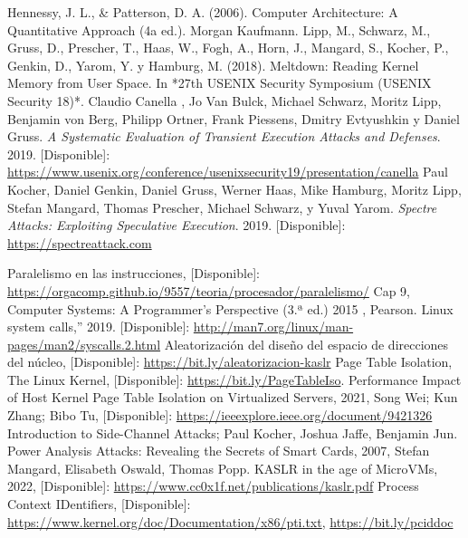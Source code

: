 \documentclass[lettersize,compsoc]{IEEEtran}
\begin{document}
\begin{thebibliography}{9}

 Hennessy, J. L., & Patterson, D. A. (2006). Computer Architecture: A Quantitative Approach (4a ed.). Morgan Kaufmann.
 Lipp, M., Schwarz, M., Gruss, D., Prescher, T., Haas, W., Fogh, A., Horn, J., Mangard, S., Kocher, P., Genkin, D., Yarom, Y. y Hamburg, M. (2018). Meltdown: Reading Kernel Memory from User Space. In *27th USENIX Security Symposium (USENIX Security 18)*.
 Claudio Canella , Jo Van Bulck, Michael Schwarz, Moritz Lipp, Benjamin von Berg, Philipp Ortner, Frank Piessens, Dmitry Evtyushkin y Daniel Gruss. \textit{A Systematic Evaluation of Transient Execution Attacks and Defenses}. 2019. [Disponible]: \url{https://www.usenix.org/conference/usenixsecurity19/presentation/canella}
 Paul Kocher, Daniel Genkin, Daniel Gruss, Werner Haas, Mike Hamburg, Moritz Lipp, Stefan Mangard, Thomas Prescher, Michael Schwarz, y Yuval Yarom. \textit{Spectre Attacks: Exploiting Speculative Execution}. 2019. [Disponible]: \url{https://spectreattack.com}

 Paralelismo en las instrucciones, [Disponible]: \url{https://orgacomp.github.io/9557/teoria/procesador/paralelismo/}
 Cap 9, Computer Systems: A Programmer’s Perspective (3.ª ed.) 2015 , Pearson.
  Linux system calls,” 2019. [Disponible]: \url{http://man7.org/linux/man-pages/man2/syscalls.2.html} 
 Aleatorización del diseño del espacio de direcciones del núcleo, [Disponible]: \url{https://bit.ly/aleatorizacion-kaslr}
 Page Table Isolation, The Linux Kernel, [Disponible]: \url{https://bit.ly/PageTableIso}.
 Performance Impact of Host Kernel Page Table Isolation on Virtualized Servers, 2021, Song Wei; Kun Zhang; Bibo Tu, [Disponible]: \url{https://ieeexplore.ieee.org/document/9421326}
 Introduction to Side-Channel Attacks; Paul Kocher, Joshua Jaffe, Benjamin Jun.
 Power Analysis Attacks: Revealing the Secrets of Smart Cards, 2007,  Stefan Mangard, Elisabeth Oswald, Thomas Popp.
 KASLR in the age of MicroVMs, 2022, [Disponible]: \url{https://www.cc0x1f.net/publications/kaslr.pdf}
 Process Context IDentifiers, [Disponible]: \url{https://www.kernel.org/doc/Documentation/x86/pti.txt}, \url{https://bit.ly/pciddoc}


\end{thebibliography}
\end{document}
